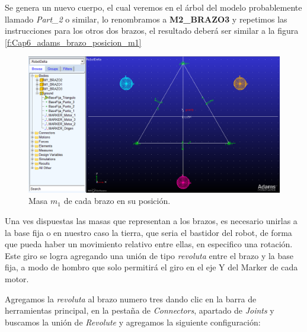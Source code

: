         Se genera un nuevo cuerpo, el cual veremos en el árbol del modelo probablemente llamado \textit{Part\_2} o similar, lo renombramos a \textbf{M2\_BRAZO3} y repetimos las instrucciones para los otros dos brazos, el resultado deberá ser similar a la figura \eqref{f:Cap6_adams_brazo_posicion_m1}
        
        \begin{figure}[h]
            \centering
            \includegraphics[width=1\linewidth]{Main/Chapter6/Images6/adams/brazo/posicion_m1.png}
            \caption{Masa $m_{1}$ de cada brazo en su posición.}
            \label{f:Cap6_adams_brazo_posicion_m1}
        \end{figure}
        
        Una ves dispuestas las masas que representan a los brazos, es necesario unirlas a la base fija o en nuestro caso la tierra, que seria el bastidor del robot, de forma que pueda haber un movimiento relativo entre ellas, en especifico una rotación. Este giro se logra agregando una unión de tipo \textit{revoluta} entre el brazo y la base fija, a modo de hombro que solo permitirá el giro en el eje Y del Marker de cada motor.
        
        Agregamos la \textit{revoluta} al brazo numero tres dando clic en la barra de herramientas principal, en la pestaña de \textit{Connectors}, apartado de \textit{Joints} y buscamos la unión de \textit{Revolute} y agregamos la siguiente configuración:
        
